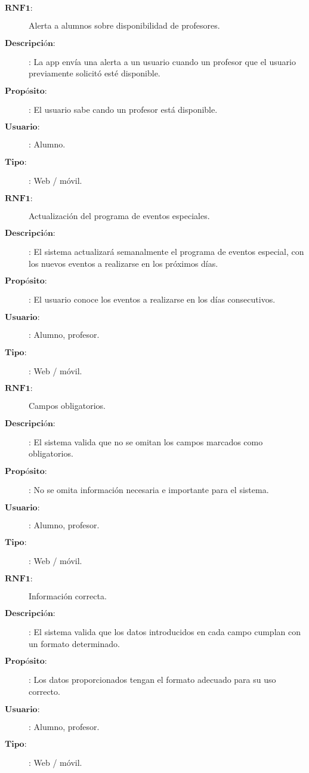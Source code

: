 \begin{description}
\item[$\textbf{RNF1:}$] Alerta a alumnos sobre disponibilidad de profesores.  
\item[$\textbf{Descripción:}$]: La app envía una alerta a un usuario cuando un profesor que el usuario previamente solicitó esté disponible.
\item[$\textbf{Propósito:}$]: El usuario sabe cando un profesor está disponible.
\item[$\textbf{Usuario:}$]: Alumno.
\item[$\textbf{Tipo:}$]: Web / móvil. \\

\item[$\textbf{RNF1:}$] Actualización del programa de eventos especiales.  
\item[$\textbf{Descripción:}$]: El sistema actualizará semanalmente el programa de eventos especial, con los nuevos eventos a realizarse en los próximos días. 
\item[$\textbf{Propósito:}$]: El usuario conoce los eventos a realizarse en los días consecutivos. 
\item[$\textbf{Usuario:}$]: Alumno, profesor.
\item[$\textbf{Tipo:}$]: Web / móvil. \\

\item[$\textbf{RNF1:}$] Campos obligatorios.  
\item[$\textbf{Descripción:}$]: El sistema valida que no se omitan los campos marcados como obligatorios. 
\item[$\textbf{Propósito:}$]: No se omita información necesaria e importante para el sistema. 
\item[$\textbf{Usuario:}$]: Alumno, profesor.
\item[$\textbf{Tipo:}$]: Web / móvil. \\

\item[$\textbf{RNF1:}$] Información correcta.  
\item[$\textbf{Descripción:}$]: El sistema valida que los datos introducidos en cada campo cumplan con un formato determinado.
\item[$\textbf{Propósito:}$]: Los datos proporcionados tengan el formato adecuado para su uso correcto.
\item[$\textbf{Usuario:}$]: Alumno, profesor.
\item[$\textbf{Tipo:}$]: Web / móvil. \\


\end{description}